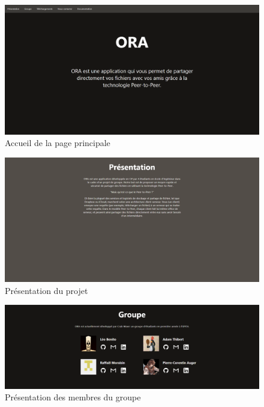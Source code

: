\documentclass[11pt, a4paper]{report}
\begin{document}
      \begin{figure}[H]
        \centering
        \includegraphics[width=17cm]{assets/presentation1/website_screenshots/home.png}
        \caption{Accueil de la page principale}
      \end{figure}
      \begin{figure}[H]
        \centering
        \includegraphics[width=17cm]{assets/presentation1/website_screenshots/presentation.png}
        \caption{Présentation du projet}
      \end{figure}
      \begin{figure}[H]
        \centering
        \includegraphics[width=17cm]{assets/presentation1/website_screenshots/group.png}
        \caption{Présentation des membres du groupe}
      \end{figure}
\end{document}
